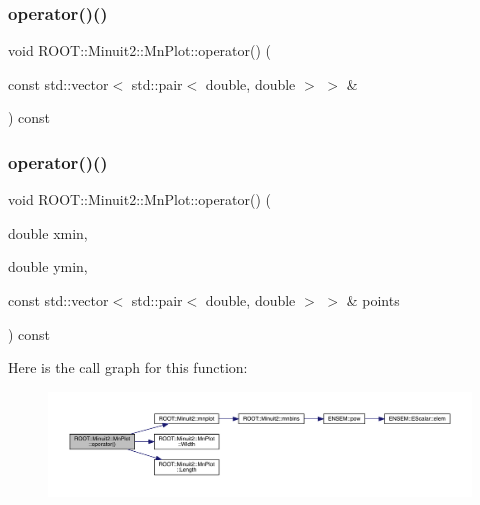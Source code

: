 \subsubsection{\texorpdfstring{operator()()}{operator()()}\hspace{0.1cm}{\footnotesize\ttfamily [2/4]}}
{\footnotesize\ttfamily void R\+O\+O\+T\+::\+Minuit2\+::\+Mn\+Plot\+::operator() (\begin{DoxyParamCaption}\item[{const std\+::vector$<$ std\+::pair$<$ double, double $>$ $>$ \&}]{ }\end{DoxyParamCaption}) const}

\mbox{\label{classROOT_1_1Minuit2_1_1MnPlot_a6cae4ab8961e9f7933320789d101ec1e}} 
\subsubsection{\texorpdfstring{operator()()}{operator()()}\hspace{0.1cm}{\footnotesize\ttfamily [3/4]}}
{\footnotesize\ttfamily void R\+O\+O\+T\+::\+Minuit2\+::\+Mn\+Plot\+::operator() (\begin{DoxyParamCaption}\item[{double}]{xmin,  }\item[{double}]{ymin,  }\item[{const std\+::vector$<$ std\+::pair$<$ double, double $>$ $>$ \&}]{points }\end{DoxyParamCaption}) const}

Here is the call graph for this function\+:\nopagebreak
\begin{figure}[H]
\begin{center}
\leavevmode
\includegraphics[width=350pt]{d1/d62/classROOT_1_1Minuit2_1_1MnPlot_a6cae4ab8961e9f7933320789d101ec1e_cgraph}
\end{center}
\end{figure}
\mbox{\label{classROOT_1_1Minuit2_1_1MnPlot_a6cae4ab8961e9f7933320789d101ec1e}} 
